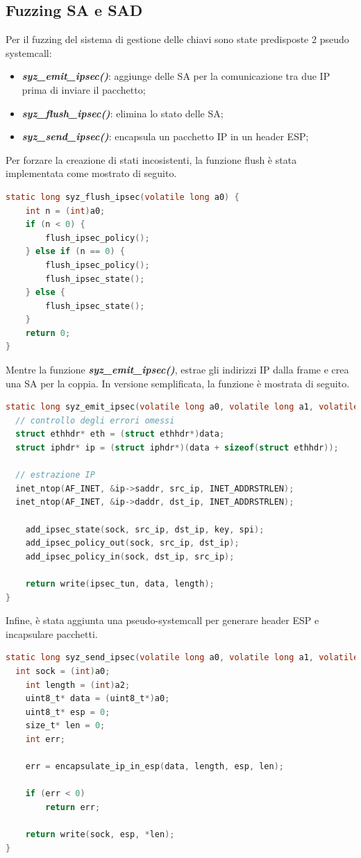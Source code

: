 \documentclass{article}
\begin{document}
\subsection{Fuzzing SA e SAD}
Per il fuzzing del sistema di gestione delle chiavi sono state predisposte 2 pseudo systemcall:
\begin{itemize}
  \item \textbf{\textit{syz\_emit\_ipsec()}}: aggiunge delle SA per la comunicazione tra due IP prima di inviare il 
    pacchetto;
  \item \textbf{\textit{syz\_flush\_ipsec()}}: elimina lo stato delle SA;
  \item \textbf{\textit{syz\_send\_ipsec()}}: encapsula un pacchetto IP in un header ESP;
\end{itemize}

Per forzare la creazione di stati incosistenti, la funzione flush è stata implementata 
come mostrato di seguito. 

\begin{lstlisting}[language=C,caption=Pseudo systemcall per la rimozione di SA dal SAD]
static long syz_flush_ipsec(volatile long a0) {
	int n = (int)a0;
	if (n < 0) {
		flush_ipsec_policy();
	} else if (n == 0) {
		flush_ipsec_policy();
		flush_ipsec_state();
	} else {
		flush_ipsec_state();
	}
	return 0;
}
\end{lstlisting}

Mentre la funzione \textbf{\textit{syz\_emit\_ipsec()}}, estrae gli indirizzi IP dalla frame 
e crea una SA per la coppia. In versione semplificata, la funzione è mostrata di seguito.
\begin{lstlisting}[language=C,caption=Creazione di una SA per una frame Ethernet]
static long syz_emit_ipsec(volatile long a0, volatile long a1, volatile long a2) {
  // controllo degli errori omessi
  struct ethhdr* eth = (struct ethhdr*)data;
  struct iphdr* ip = (struct iphdr*)(data + sizeof(struct ethhdr));

  // estrazione IP
  inet_ntop(AF_INET, &ip->saddr, src_ip, INET_ADDRSTRLEN);
  inet_ntop(AF_INET, &ip->daddr, dst_ip, INET_ADDRSTRLEN);

	add_ipsec_state(sock, src_ip, dst_ip, key, spi);
	add_ipsec_policy_out(sock, src_ip, dst_ip);
	add_ipsec_policy_in(sock, dst_ip, src_ip);

	return write(ipsec_tun, data, length);
}
\end{lstlisting}

Infine, è stata aggiunta una pseudo-systemcall per generare header ESP e incapsulare pacchetti. 
\begin{lstlisting}[language=C,caption=Incapsulamento di un pacchetto proveniente da una socket]
static long syz_send_ipsec(volatile long a0, volatile long a1, volatile long a2) {
  int sock = (int)a0;
	int length = (int)a2;
	uint8_t* data = (uint8_t*)a0;
	uint8_t* esp = 0;
	size_t* len = 0;
	int err;

	err = encapsulate_ip_in_esp(data, length, esp, len);

	if (err < 0)
		return err;

	return write(sock, esp, *len);
}
\end{lstlisting}
\end{document}
